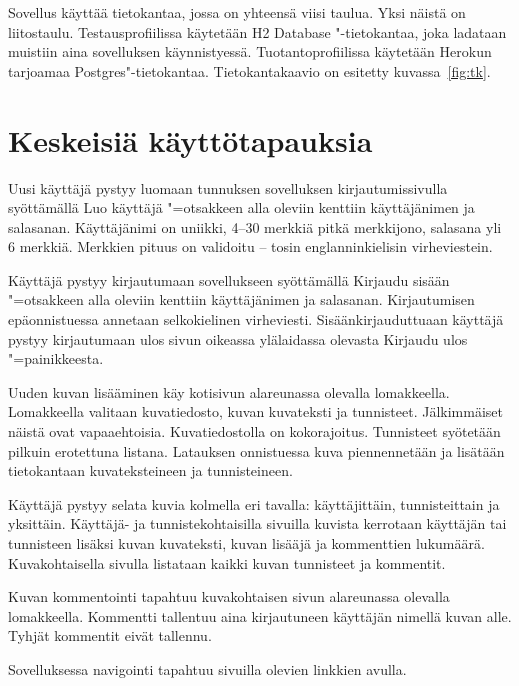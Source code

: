\documentclass[finnish,colorlinks,headings=normal,parskip=half,footsepline]{scrartcl}
\begin{document}
Sovellus käyttää tietokantaa, jossa on yhteensä viisi taulua. Yksi näistä on liitostaulu. Testausprofiilissa käytetään H2 Database "-tietokantaa, joka ladataan muistiin aina sovelluksen käynnistyessä. Tuotantoprofiilissa käytetään Herokun tarjoamaa Postgres"-tietokantaa. Tietokantakaavio on esitetty kuvassa~\ref{fig:tk}.

\section{Keskeisiä käyttötapauksia}
Uusi käyttäjä pystyy luomaan tunnuksen sovelluksen kirjautumissivulla syöttämällä Luo käyttäjä "=otsakkeen alla oleviin kenttiin käyttäjänimen ja salasanan. Käyttäjänimi on uniikki, 4--30 merkkiä pitkä merkkijono, salasana yli 6 merkkiä. Merkkien pituus on validoitu -- tosin englanninkielisin virheviestein.

Käyttäjä pystyy kirjautumaan sovellukseen syöttämällä Kirjaudu sisään "=otsakkeen alla oleviin kenttiin käyttäjänimen ja salasanan. Kirjautumisen epäonnistuessa annetaan selkokielinen virheviesti. Sisäänkirjauduttuaan käyttäjä pystyy kirjautumaan ulos sivun oikeassa ylälaidassa olevasta Kirjaudu ulos "=painikkeesta.

Uuden kuvan lisääminen käy kotisivun alareunassa olevalla lomakkeella. Lomakkeella valitaan kuvatiedosto, kuvan kuvateksti ja tunnisteet. Jälkimmäiset näistä ovat vapaaehtoisia. Kuvatiedostolla on kokorajoitus. Tunnisteet syötetään pilkuin erotettuna listana. Latauksen onnistuessa kuva piennennetään ja lisätään tietokantaan kuvateksteineen ja tunnisteineen.

Käyttäjä pystyy selata kuvia kolmella eri tavalla: käyttäjittäin, tunnisteittain ja yksittäin. Käyttäjä- ja tunnistekohtaisilla sivuilla kuvista kerrotaan käyttäjän tai tunnisteen lisäksi kuvan kuvateksti, kuvan lisääjä ja kommenttien lukumäärä. Kuvakohtaisella sivulla listataan kaikki kuvan tunnisteet ja kommentit.

Kuvan kommentointi tapahtuu kuvakohtaisen sivun alareunassa olevalla lomakkeella. Kommentti tallentuu aina kirjautuneen käyttäjän nimellä kuvan alle. Tyhjät kommentit eivät tallennu.

Sovelluksessa navigointi tapahtuu sivuilla olevien linkkien avulla.																																																																																																																																																																																																																																																																																																																																																																																																																				
\end{document}
